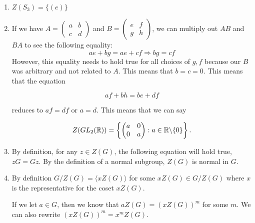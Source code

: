 \documentclass[12pt]{report}
\begin{document}
\newpage
{}
\sol
\begin{enumerate}[label=\alph*.]
    \item $Z(S_3) = \{ (e) \}$
    \item If we have $A = \begin{pmatrix}
        a & b \\
        c & d
    \end{pmatrix}$ and $B =\begin{pmatrix}
        e & f \\
        g & h
    \end{pmatrix}$, we can multiply out $AB$ and $BA$ to see the following equality:
    $$ae + bg = ae + cf \Rightarrow bg = cf$$
    However, this equality needs to hold true for all choices of $g,f$ because our $B$ was arbitrary and not related to $A$. This means that $b= c =0$. This means that the equation

    $$af + bh = be + df$$

    reduces to $af = df$ or $a=d$. This means that we can say 

    $$Z(GL_2(\RR)) = \left\{\begin{pmatrix}
        a & 0 \\
        0 & a
    \end{pmatrix} : a \in \RR \backslash \{0\} \right\}.$$
    \item By definition, for any $z \in Z(G)$, the following equation will hold true, $zG=Gz$. By the definition of a normal subgroup, $Z(G)$ is normal in $G$. 
    \item By definition $G/Z(G) = \langle xZ(G) \rangle$ for some $xZ(G) \in G/Z(G)$ where $x$ is the representative for the coset $xZ(G)$. 
    
    If we let $a \in G$, then we know that $aZ(G) = (xZ(G))^m$ for some $m$. We can also rewrite $(xZ(G))^m = x^mZ(G)$.


\end{enumerate}
\end{document}
